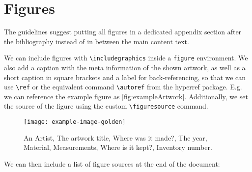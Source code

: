\documentclass{rub-kunstgeschichte}
\begin{document}
    \clearpage
    \section{Figures}
    The guidelines suggest putting all figures in a dedicated appendix section after the bibliography instead of in between the main content text.\autocite[10,25]{guidelines}

    We can include figures with \verb|\includegraphics| inside a \texttt{figure} environment. We also add a caption with the meta information of the shown artwork,\autocite[25--26]{guidelines} as well as a short caption in square brackets and a label for back-referencing, so that we can use \verb|\ref| or the equivalent command \verb|\autoref| from the \textsf{hyperref} package.
    E.g. we can reference the example figure as \autoref{fig:exampleArtwork}.
    Additionally, we set the source of the figure using the custom \verb|\figuresource| command.

    \begin{figure}[H]
        \centering
        \texttt{[image: example-image-golden]}
        \caption{An Artist, The artwork title, Where was it made?, The year, Material, Measurements, Where is it kept?, Inventory number.}
        \label{fig:exampleArtwork}
    \end{figure}

    We can then include a list of figure sources at the end of the document:
    \printfiguresources%

\end{document}
